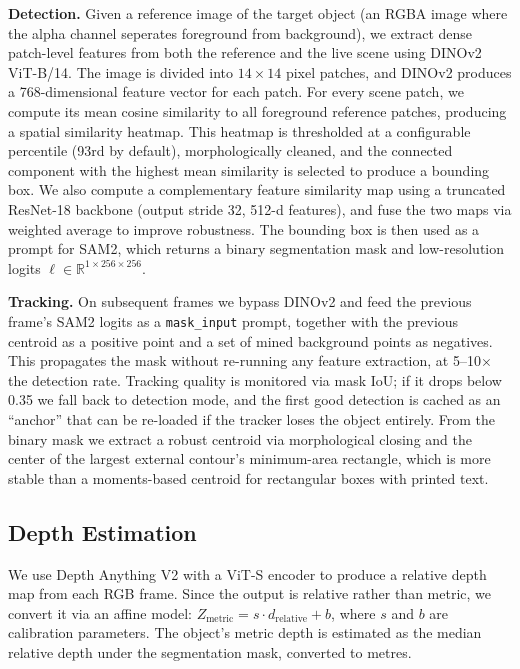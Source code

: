\documentclass[letterpaper, 10 pt, conference]{ieeeconf}  %
\begin{document}
\textbf{Detection.}
Given a reference image of the target object (an RGBA image where the alpha channel seperates foreground from background), we extract dense patch-level features from both the reference and the live scene using DINOv2 ViT-B/14. The image is divided into $14 \times 14$ pixel patches, and DINOv2 produces a 768-dimensional feature vector for each patch. For every scene patch, we compute its mean cosine similarity to all foreground reference patches, producing a spatial similarity heatmap. This heatmap is thresholded at a configurable percentile (93rd by default), morphologically cleaned, and the connected component with the highest mean similarity is selected to produce a bounding box. We also compute a complementary feature similarity map using a truncated ResNet-18 backbone (output stride 32, 512-d features), and fuse the two maps via weighted average to improve robustness. The bounding box is then used as a prompt for SAM2, which returns a binary segmentation mask and low-resolution logits $\boldsymbol{\ell} \in \mathbb{R}^{1 \times 256 \times 256}$.

\textbf{Tracking.}
On subsequent frames we bypass DINOv2 and feed the previous frame's SAM2 logits as a \texttt{mask\_input} prompt, together with the previous centroid as a positive point and a set of mined background points as negatives. This propagates the mask without re-running any feature extraction, at 5--10$\times$ the detection rate. Tracking quality is monitored via mask IoU; if it drops below 0.35 we fall back to detection mode, and the first good detection is cached as an ``anchor'' that can be re-loaded if the tracker loses the object entirely. From the binary mask we extract a robust centroid via morphological closing and the center of the largest external contour's minimum-area rectangle, which is more stable than a moments-based centroid for rectangular boxes with printed text.

\subsection{Depth Estimation}

We use Depth Anything V2 with a ViT-S encoder to produce a relative depth map from each RGB frame. Since the output is relative rather than metric, we convert it via an affine model: $Z_{\text{metric}} = s \cdot d_{\text{relative}} + b$, where $s$ and $b$ are calibration parameters. The object's metric depth is estimated as the median relative depth under the segmentation mask, converted to metres.
\end{document}

